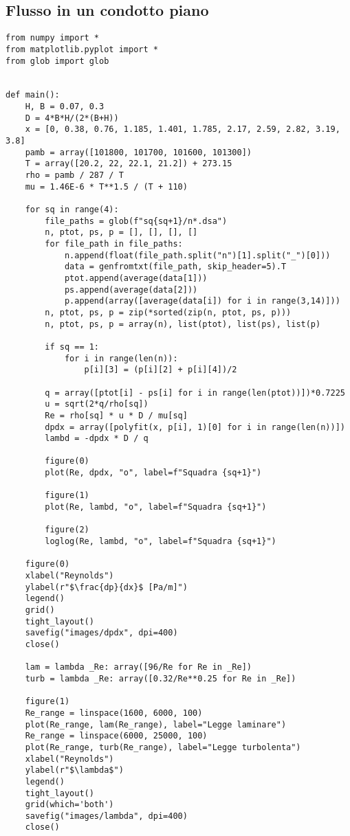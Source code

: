 \subsection{Flusso in un condotto piano}\label{b7}
\begin{lstlisting}
from numpy import *
from matplotlib.pyplot import *
from glob import glob


def main():
    H, B = 0.07, 0.3
    D = 4*B*H/(2*(B+H))
    x = [0, 0.38, 0.76, 1.185, 1.401, 1.785, 2.17, 2.59, 2.82, 3.19, 3.8]
    pamb = array([101800, 101700, 101600, 101300])
    T = array([20.2, 22, 22.1, 21.2]) + 273.15
    rho = pamb / 287 / T
    mu = 1.46E-6 * T**1.5 / (T + 110)

    for sq in range(4):
        file_paths = glob(f"sq{sq+1}/n*.dsa")
        n, ptot, ps, p = [], [], [], []
        for file_path in file_paths:
            n.append(float(file_path.split("n")[1].split("_")[0]))
            data = genfromtxt(file_path, skip_header=5).T
            ptot.append(average(data[1]))
            ps.append(average(data[2]))
            p.append(array([average(data[i]) for i in range(3,14)]))
        n, ptot, ps, p = zip(*sorted(zip(n, ptot, ps, p)))
        n, ptot, ps, p = array(n), list(ptot), list(ps), list(p)

        if sq == 1:
            for i in range(len(n)):
                p[i][3] = (p[i][2] + p[i][4])/2

        q = array([ptot[i] - ps[i] for i in range(len(ptot))])*0.7225
        u = sqrt(2*q/rho[sq])
        Re = rho[sq] * u * D / mu[sq]
        dpdx = array([polyfit(x, p[i], 1)[0] for i in range(len(n))])
        lambd = -dpdx * D / q

        figure(0)
        plot(Re, dpdx, "o", label=f"Squadra {sq+1}")

        figure(1)
        plot(Re, lambd, "o", label=f"Squadra {sq+1}")

        figure(2)
        loglog(Re, lambd, "o", label=f"Squadra {sq+1}")

    figure(0)
    xlabel("Reynolds")
    ylabel(r"$\frac{dp}{dx}$ [Pa/m]")
    legend()
    grid()
    tight_layout()
    savefig("images/dpdx", dpi=400)
    close()

    lam = lambda _Re: array([96/Re for Re in _Re])
    turb = lambda _Re: array([0.32/Re**0.25 for Re in _Re])

    figure(1)
    Re_range = linspace(1600, 6000, 100)
    plot(Re_range, lam(Re_range), label="Legge laminare")
    Re_range = linspace(6000, 25000, 100)
    plot(Re_range, turb(Re_range), label="Legge turbolenta")
    xlabel("Reynolds")
    ylabel(r"$\lambda$")
    legend()
    tight_layout()
    grid(which='both')
    savefig("images/lambda", dpi=400)
    close()


\end{lstlisting}
